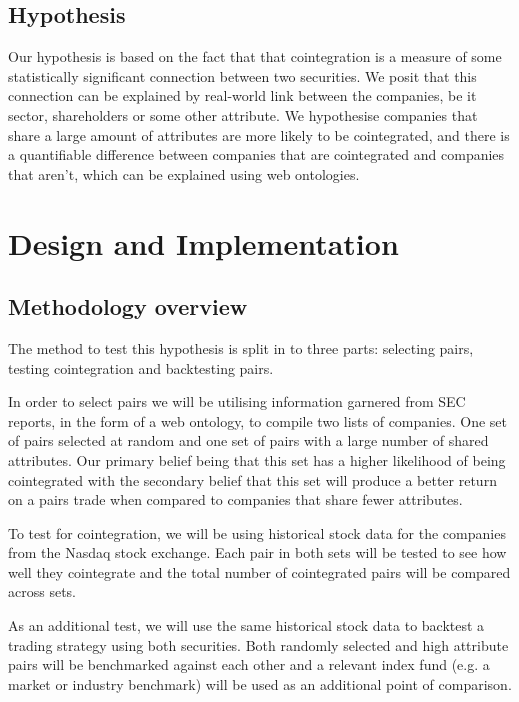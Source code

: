 \documentclass{UoYCSproject}
\begin{document}
\section{Hypothesis}

Our hypothesis is based on the fact that that cointegration is a measure of some statistically significant connection between two securities. We posit that this connection can be explained by real-world link between the companies, be it sector, shareholders or some other attribute. We hypothesise companies that share a large amount of attributes are more likely to be cointegrated, and there is a quantifiable difference between companies that are cointegrated and companies that aren't, which can be explained using web ontologies.

\chapter{Design and Implementation}
\label{cha:Design and Implementation}

\section{Methodology overview}

The method to test this hypothesis is split in to three parts: selecting pairs, testing cointegration and backtesting pairs. 

In order to select pairs we will be utilising information garnered from SEC reports, in the form of a web ontology, to compile two lists of companies. One set of pairs selected at random and one set of pairs with a large number of shared attributes. Our primary belief being that this set has a higher likelihood of being cointegrated with the secondary belief that this set will produce a better return on a pairs trade when compared to companies that share fewer attributes.

To test for cointegration, we will be using historical stock data for the companies from the Nasdaq stock exchange. Each pair in both sets will be tested to see how well they cointegrate and the total number of cointegrated pairs will be compared across sets.

As an additional test, we will use the same historical stock data to backtest a trading strategy using both securities. Both randomly selected and high attribute pairs will be benchmarked against each other and a relevant index fund (e.g. a market or industry benchmark) will be used as an additional point of comparison.
\end{document}
